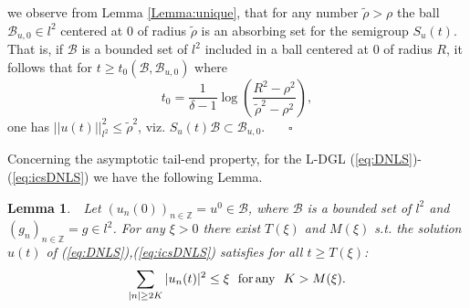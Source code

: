 \documentclass[preprintnumbers,amsmath,amssymb]{revtex4}
\newtheorem{lemma}{Lemma}[section]
\begin{document}
we observe from Lemma \ref{Lemma:unique}, that for any number $\tilde{\rho}>\rho$ the ball $\mathcal{B}  _{u,0}\in l^2$  centered at $0$ of radius $\tilde{\rho}$ is an absorbing set for the semigroup $S_u(t).$ That is, if $\mathcal{B}$ is a bounded set of $l^2$ included in a ball centered at $0$ of radius $R$, it follows that for $t\ge t_0(\mathcal{B},\mathcal{B}_{u,0})$ where 
\begin{equation}
 t_0=\frac{1}{\delta-1}\log\left(\frac{R^2-\rho^2}{\tilde{\rho}^2-\rho^2}\right),
\end{equation}
one has $|| u(t)||_{l^2}^2\le \tilde{\rho}^2$, viz.
$S_u(t)\mathcal{B}\subset \mathcal{B}_{u,0}$.  \ \ \ $\square$



\vspace*{0.5cm}

Concerning the asymptotic tail-end property, for 
the L-DGL (\ref{eq:DNLS})-(\ref{eq:icsDNLS}) we have the following Lemma. 

\vspace*{0.5cm}
\begin{lemma}
 {\it \,\,  Let $(u_n(0))_{n\in {\mathbb{Z}}}=u^0 \in \mathcal{B}$, where $\mathcal{B}$ is a bounded set of $l^2$ and 
 $(g_n)_{n\in {\mathbb{Z}}}=g \in l^2$. For any $\xi>0$ there exist
 $T(\xi)$ and $M(\xi)$ s.t. the solution $u(t)$ of (\ref{eq:DNLS}),(\ref{eq:icsDNLS}) satisfies for all $t\ge T(\xi)$:
 \begin{equation}
  \sum_{|n|\ge 2K}|u_n(t)|^2\le \xi\,\,\,\,{\rm for\, any\,\,\,\,} K>M(\xi).\label{eq:asymptoticDNLS}
 \end{equation}}\label{Lemma:asymtailgamma}
 \end{lemma}
\end{document}
